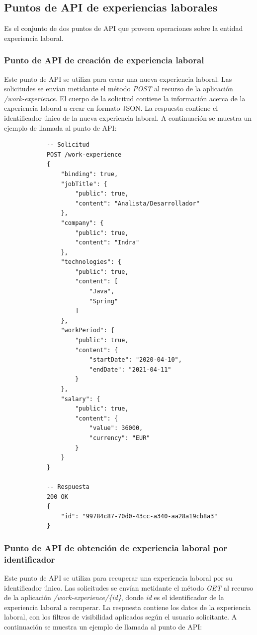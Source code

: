\documentclass[a4paper, 12pt]{book}
\begin{document}
\subsection{Puntos de API de experiencias laborales}
\label{subsec:work_experience_endpoints}
Es el conjunto de dos puntos de API que proveen operaciones sobre la entidad experiencia laboral.

\subsubsection{Punto de API de creación de experiencia laboral}
\label{subsec:post_work_experience}
Este punto de API se utiliza para crear una nueva experiencia laboral.
Las solicitudes se envían metidante el método \emph{POST} al recurso de la aplicación \emph{/work-experience}.
El cuerpo de la solicitud contiene la información acerca de la experiencia laboral a crear en formato JSON.
La respuesta contiene el identificador único de la nueva experiencia laboral.
A continuación se muestra un ejemplo de llamada al punto de API:

			{\footnotesize
			\begin{verbatim}
			-- Solicitud
			POST /work-experience
			{
			    "binding": true,
			    "jobTitle": {
			        "public": true,
			        "content": "Analista/Desarrollador"
			    },
			    "company": {
			        "public": true,
			        "content": "Indra"
			    },
			    "technologies": {
			        "public": true,
			        "content": [
			            "Java",
			            "Spring"
			        ]
			    },
			    "workPeriod": {
			        "public": true,
			        "content": {
			            "startDate": "2020-04-10",
			            "endDate": "2021-04-11"
			        }
			    },
			    "salary": {
			        "public": true,
			        "content": {
			            "value": 36000,
			            "currency": "EUR"
			        }
			    }
			}

			-- Respuesta
			200 OK
			{
			    "id": "99784c87-70d0-43cc-a340-aa28a19cb8a3"
			}
			\end{verbatim}
			}

\subsubsection{Punto de API de obtención de experiencia laboral por identificador}
\label{subsec:get_work_experience_id}
Este punto de API se utiliza para recuperar una experiencia laboral por su identificador único.
Las solicitudes se envían metidante el método \emph{GET} al recurso de la aplicación \emph{/work-experience/\{id\}}, donde \emph{id} es el identificador de la experiencia laboral a recuperar.
La respuesta contiene los datos de la experiencia laboral, con los filtros de visibilidad aplicados según el usuario solicitante.
A continuación se muestra un ejemplo de llamada al punto de API:
\end{document}
